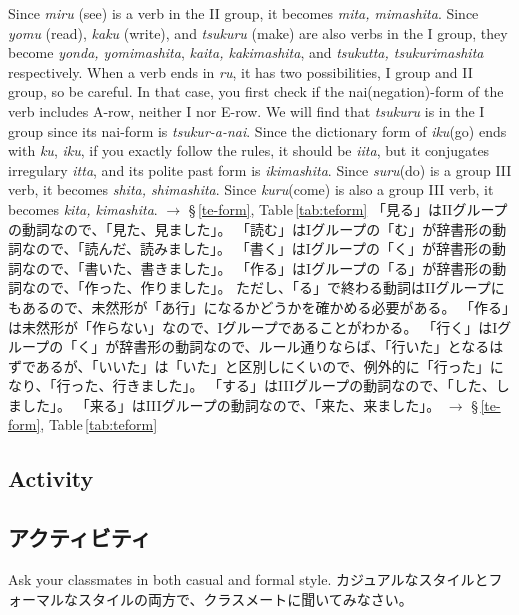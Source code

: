 \documentclass[uplatex,dvipdfmx,b5paper,english,10pt]{jsbook}
\begin{document}
\begin{toianswer} %
\ifEnglish
Since {\it miru\/} (see) is a verb in the II group, it becomes {\it mita, mimashita\/}.
Since {\it yomu\/} (read), {\it kaku\/} (write), and {\it tsukuru\/} (make) are also verbs in the I group, they become {\it yonda, yomimashita\/}, {\it kaita, kakimashita\/}, and {\it tsukutta, tsukurimashita\/} respectively.
When a verb ends in {\it ru\/}, it has two possibilities, I group and II group, so be careful.
In that case, you first check if the nai(negation)-form of the verb includes A-row, neither I nor E-row.
We will find that {\it tsukuru\/} is in the I group since its nai-form is {\it tsukur-a-nai\/}.
Since the dictionary form of {\it iku\/}(go) ends with {\it ku\/}, {\it iku\/}, if you exactly follow the rules, it should be {\it iita\/}, but it conjugates irregulary {\it itta\/}, and its polite past form is {\it ikimashita\/}.
Since {\it suru\/}(do) is a group III verb, it becomes {\it shita, shimashita\/}.
Since {\it kuru\/}(come) is also a group III verb, it becomes {\it kita, kimashita\/}.
$\rightarrow$ \S\,\ref{te-form}, Table\,\ref{tab:teform}
\else
「見る」はIIグループの動詞なので、「見た、見ました」。
「読む」はIグループの「む」が辞書形の動詞なので、「読んだ、読みました」。
「書く」はIグループの「く」が辞書形の動詞なので、「書いた、書きました」。
「作る」はIグループの「る」が辞書形の動詞なので、「作った、作りました」。
ただし、「る」で終わる動詞はIIグループにもあるので、未然形が「あ行」になるかどうかを確かめる必要がある。
「作る」は未然形が「作らない」なので、Iグループであることがわかる。
「行く」はIグループの「く」が辞書形の動詞なので、ルール通りならば、「行いた」となるはずであるが、「いいた」は「いた」と区別しにくいので、例外的に「行った」になり、「行った、行きました」。
「する」はIIIグループの動詞なので、「した、しました」。
「来る」はIIIグループの動詞なので、「来た、来ました」。
$\rightarrow$ \S\,\ref{te-form}, Table\,\ref{tab:teform}
\fi
\end{toianswer}


\ifEnglish
\subsection{Activity}
\else
\subsection{アクティビティ}
\fi

\begin{toiquestion}
\ifEnglish
Ask your classmates in both casual and formal style.
\else
カジュアルなスタイルとフォーマルなスタイルの両方で、クラスメートに聞いてみなさい。
\fi
\end{toiquestion}
\end{document}
